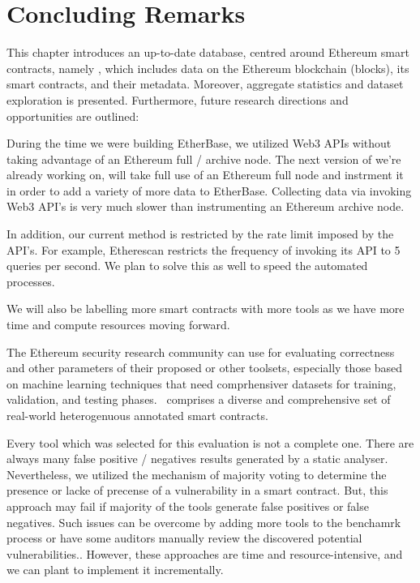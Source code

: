 \section{Concluding Remarks}
	This chapter introduces an up-to-date database, centred around Ethereum smart contracts, namely \etherbase, which includes data on the Ethereum blockchain (blocks),
	its smart contracts, and their metadata.
	Moreover, aggregate statistics and dataset exploration is presented.
	Furthermore, future research directions and opportunities are outlined:

	During the time we were building EtherBase, we utilized Web3 APIs without taking advantage of an Ethereum full / archive node.
	The next version of \etherbase we're already working on, will take full use of an Ethereum full node and instrment it in order to add a variety of more data to EtherBase.
	Collecting data via invoking Web3 API's is very much slower than instrumenting an Ethereum archive node.
	
	In addition, our current method is restricted by the rate limit imposed by the API's.
	For example, Etherescan restricts the frequency of invoking its API to 5 queries per second. We plan to solve this as well to speed the automated processes.

	We will also be labelling more smart contracts with more tools as we have more time and compute resources moving forward.

	The Ethereum security research community can use \etherbase for evaluating correctness and other parameters of their proposed or other toolsets,
	especially those based on machine learning techniques that need comprhensiver datasets for training, validation, and testing phases.
	\etherbase~comprises a diverse and comprehensive set of real-world heterogenuous annotated smart contracts.
	
	Every tool which was selected for this evaluation is not a complete one.
	There are always many false positive / negatives results generated by a static analyser.
	Nevertheless, we utilized the mechanism of majority voting to determine the presence or lacke of precense of a vulnerability in a smart contract.
	But, this approach may fail if majority of the tools generate false positives or false negatives.
	Such issues can be overcome by adding more tools to the benchamrk process or have some auditors manually review the discovered potential vulnerabilities..
	However, these approaches are time and resource-intensive, and we can plant to implement it incrementally.